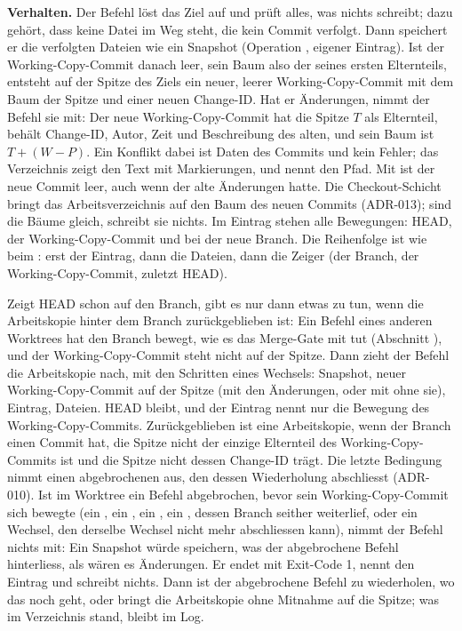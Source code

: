 {\bf Verhalten.} Der Befehl löst das Ziel auf und prüft alles, was nichts schreibt;
dazu gehört, dass keine Datei im Weg steht, die kein Commit verfolgt.
Dann speichert er die verfolgten Dateien wie ein Snapshot
(Operation , eigener Eintrag).
Ist der Working-Copy-Commit danach leer, sein Baum also der seines ersten Elternteils,
entsteht auf der Spitze des Ziels ein neuer, leerer Working-Copy-Commit mit dem Baum der Spitze
und einer neuen Change-ID.
Hat er Änderungen, nimmt der Befehl sie mit: Der neue Working-Copy-Commit hat die Spitze $T$ als
Elternteil, behält Change-ID, Autor, Zeit und Beschreibung des alten, und sein Baum ist
$T + (W - P)$. Ein Konflikt dabei ist Daten des Commits und kein Fehler; das Verzeichnis zeigt den
Text mit Markierungen, und  nennt den Pfad.
Mit  ist der neue Commit leer, auch wenn der alte Änderungen hatte.
Die Checkout-Schicht bringt das Arbeitsverzeichnis auf den Baum des neuen Commits (ADR-013);
sind die Bäume gleich, schreibt sie nichts.
Im Eintrag  stehen alle Bewegungen: HEAD, der Working-Copy-Commit und bei 
der neue Branch. Die Reihenfolge ist wie beim : erst der Eintrag, dann die
Dateien, dann die Zeiger (der Branch, der Working-Copy-Commit, zuletzt HEAD).

Zeigt HEAD schon auf den Branch, gibt es nur dann etwas zu tun, wenn die Arbeitskopie hinter dem
Branch zurückgeblieben ist: Ein Befehl eines anderen Worktrees hat den Branch bewegt,
wie es das Merge-Gate mit  tut (Abschnitt ),
und der Working-Copy-Commit steht nicht auf der Spitze.
Dann zieht der Befehl die Arbeitskopie nach, mit den Schritten eines Wechsels:
Snapshot, neuer Working-Copy-Commit auf der Spitze (mit den Änderungen, oder mit
 ohne sie), Eintrag, Dateien.
HEAD bleibt, und der Eintrag  nennt nur die Bewegung des Working-Copy-Commits.
Zurückgeblieben ist eine Arbeitskopie, wenn der Branch einen Commit hat,
die Spitze nicht der einzige Elternteil des Working-Copy-Commits ist
und die Spitze nicht dessen Change-ID trägt.
Die letzte Bedingung nimmt einen abgebrochenen  aus,
den dessen Wiederholung abschliesst (ADR-010).
Ist im Worktree ein Befehl abgebrochen, bevor sein Working-Copy-Commit sich bewegte
(ein , ein , ein , ein , dessen Branch
seither weiterlief, oder ein Wechsel, den derselbe Wechsel nicht mehr abschliessen kann),
nimmt der Befehl nichts mit: Ein Snapshot würde speichern, was der abgebrochene Befehl
hinterliess, als wären es Änderungen.
Er endet mit Exit-Code 1, nennt den Eintrag und schreibt nichts.
Dann ist der abgebrochene Befehl zu wiederholen, wo das noch geht,
oder  bringt die Arbeitskopie ohne Mitnahme auf die Spitze;
was im Verzeichnis stand, bleibt im Log.

